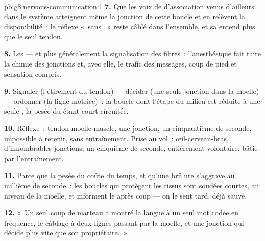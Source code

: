 \begin{solution}{pb:g8:nervous-communication:1}
\textbf{7.} Que les voix de  d'association venus d'ailleurs
dans le système atteignent même la jonction de cette boucle et en
relèvent la disponibilité~: le réflexe «~sans ~» reste câblé
dans l'ensemble, et sa  entend plus que le seul tendon.

\textbf{8.} Les  --- et plus généralement la signalisation
des fibres~: l'anesthésique fait taire la chimie des jonctions et,
avec elle, le trafic des messages, coup de pied et sensation
compris.

\textbf{9.} Signaler (l'étirement du tendon) --- décider (une seule
jonction dans la moelle) --- ordonner (la ligne motrice)~: la boucle
dont l'étape du milieu est réduite à une seule , la pesée du
 étant court-circuitée.

\textbf{10.} Réflexe~: tendon-moelle-muscle, une jonction, un
cinquantième de seconde, impossible à retenir, sans entraînement.
Prise au vol~: œil-cerveau-bras, d'innombrables jonctions, un
cinquième de seconde, entièrement volontaire, bâtie par
l'entraînement.

\textbf{11.} Parce que la pesée du  coûte du temps, et qu'une
brûlure s'aggrave au millième de seconde~: les boucles qui protègent
les tissus sont soudées courtes, au niveau de la moelle, et
informent le  après coup --- on le sent tard, déjà sauvé.

\textbf{12.} «~Un seul coup de marteau a montré la langue à un seul
mot codée en fréquence, le câblage à deux lignes passant par la
moelle, et une jonction qui décide plus vite que son propriétaire.~»
\end{solution}
